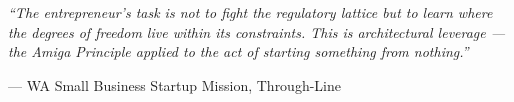 \documentclass[11pt,letterpaper]{article}
\begin{document}
\vspace{1cm}

\begin{quotebox}
\textit{``The entrepreneur's task is not to fight the regulatory lattice but to learn where the degrees of freedom live within its constraints. This is architectural leverage --- the Amiga Principle applied to the act of starting something from nothing.''}

\vspace{0.5em}
\hfill --- WA Small Business Startup Mission, Through-Line
\end{quotebox}
\end{document}
